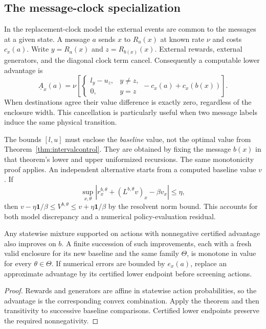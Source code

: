 \subsection{The message-clock specialization}

In the replacement-clock model the external events are common to the
messages at a given state. A message $a$ sends $x$ to $R_a(x)$ at known
rate $\nu$ and costs $c_x(a)$. Write $y=R_a(x)$ and $z=R_{b(x)}(x)$.
External rewards, external generators, and the diagonal clock term cancel.
Consequently a computable lower advantage is
\begin{equation}\label{eq:messagebaselinegain}
 \underline A_x(a)=\nu\left[
 \begin{cases}l_y-u_z,&y\ne z,\\0,&y=z\end{cases}
 -c_x(a)+c_x(b(x))\right].
\end{equation}
When destinations agree their value difference is exactly zero, regardless
of the enclosure width. This cancellation is particularly useful when two
message labels induce the same physical transition.

The bounds $[l,u]$ must enclose the \emph{baseline} value, not the optimal
value from Theorem~\ref{thm:intervalcontrol}. They are obtained by fixing the
message $b(x)$ in that theorem's lower and upper uniformized recursions.
The same monotonicity proof applies. An independent alternative starts
from a computed baseline value $v$. If
\[
 \sup_{x,\theta}|r_x^{b,\theta}
                     +(L^{b,\theta}v)_x-\beta v_x|\le\eta,
\]
then $v-\eta\mathbf1/\beta\le V^{b,\theta}
\le v+\eta\mathbf1/\beta$ by the resolvent norm bound. This accounts
for both model discrepancy and a numerical policy-evaluation residual.

\begin{corollary}
Any statewise mixture supported on actions with nonnegative certified
advantage also improves on $b$. A finite succession of such improvements,
each with a fresh valid enclosure for its new baseline and the same family
$\Theta$, is monotone in value for every $\theta\in\Theta$.
If numerical errors are bounded by $e_x(a)$, replace an approximate
advantage by its certified lower endpoint before screening actions.
\end{corollary}
\begin{proof}
Rewards and generators are affine in statewise action probabilities, so
the advantage is the corresponding convex combination. Apply the theorem
and then transitivity to successive baseline comparisons. Certified lower
endpoints preserve the required nonnegativity.
\end{proof}

